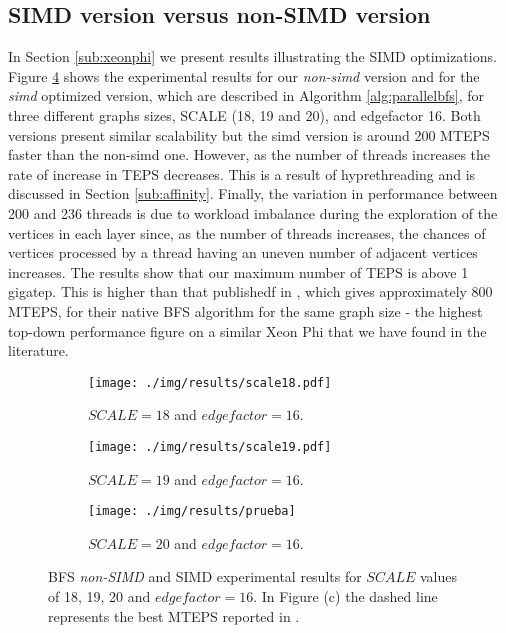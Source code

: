 \documentclass{sig-alternate-05-2015}
\begin{document}
\subsection{SIMD version versus non-SIMD version}
In Section \ref{sub:xeonphi} we present results illustrating the SIMD
optimizations. Figure \ref{fig:exp} shows the experimental results for
our \textit{non-simd} version and for the \textit{simd} optimized
version, which are described in Algorithm \ref{alg:parallelbfs}, for
three different graphs sizes, SCALE (18, 19 and 20), and edgefactor
16. Both versions present similar scalability but the simd version is
around 200 MTEPS faster than the non-simd one. However, as the number
of threads increases the rate of increase in TEPS decreases. This is a
result of hyprethreading and is discussed in Section
\ref{sub:affinity}. Finally, the variation in performance between 200
and 236 threads is due to workload imbalance during the exploration of
the vertices in each layer since, as the number of threads increases,
the chances of vertices processed by a thread having an uneven number
of adjacent vertices increases. The results show that our maximum
number of TEPS is above 1 gigatep. This is higher than that publishedf
in \cite{MICgraphs}, which gives approximately 800 MTEPS, for their
native BFS algorithm for the same graph size - the highest top-down
performance figure on a similar Xeon Phi that we have found in the
literature.

\begin{figure}
    \begin{subfigure}{0.3\textwidth}
        \centering
        \texttt{[image: ./img/results/scale18.pdf]}
      \caption{$SCALE=18$ and $edgefactor=16$.}
        \label{fidatag:nosimd}
    \end{subfigure}
    \hfill
    \begin{subfigure}{0.5\textwidth}
        \centering
        \texttt{[image: ./img/results/scale19.pdf]}

                \caption{$SCALE=19$ and $edgefactor=16$.}
        \label{fig:simd}
    \end{subfigure}
    
        \begin{subfigure}{0.5\textwidth}
        \centering
        \texttt{[image: ./img/results/prueba]}
        \caption{$SCALE=20$ and $edgefactor=16$.}
        \label{fig:simd}
    \end{subfigure}
     \caption{BFS \textit{non-SIMD} and SIMD experimental results for $SCALE$ values of 18, 19, 20 and $edgefactor=16$. In Figure (c) the dashed line represents the best MTEPS reported in \cite{MICgraphs}.}
    \label{fig:exp}
\end{figure}
\end{document}
